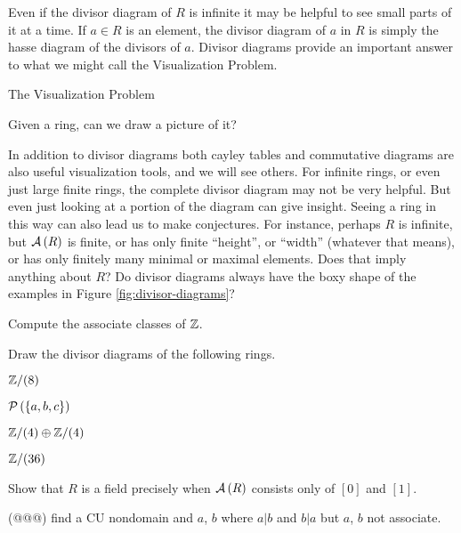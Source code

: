 Even if the divisor diagram of \(R\) is infinite it may be helpful to see small parts of it at a time.
If \(a \in R\) is an element, the divisor diagram of \(a\) in \(R\) is simply the hasse diagram of the divisors of \(a\).
Divisor diagrams provide an important answer to what we might call the Visualization Problem.
\begin{titlebox}{The Visualization Problem}
\begin{center}
Given a ring, can we draw a picture of it?
\end{center}
\end{titlebox}
In addition to divisor diagrams both cayley tables and commutative diagrams are also useful visualization tools, and we will see others.
For infinite rings, or even just large finite rings, the complete divisor diagram may not be very helpful.
But even just looking at a portion of the diagram can give insight.
Seeing a ring in this way can also lead us to make conjectures.
For instance, perhaps \(R\) is infinite, but \( \mathcal{A}\left(R\right) \) is finite, or has only finite ``height'', or ``width'' (whatever that means), or has only finitely many minimal or maximal elements. Does that imply anything about \(R\)?
Do divisor diagrams always have the boxy shape of the examples in Figure \ref{fig:divisor-diagrams}?



\Exercises%

\begin{exercise}
Compute the associate classes of \(\mathbb{Z}\).
\end{exercise}


\begin{exercise}
Draw the divisor diagrams of the following rings.
\begin{proplist*}
\item \(\mathbb{Z}/(8)\)
\item \(\mathcal{P}\left(\{a,b,c\}\right)\)
\item \(\mathbb{Z}/(4) \oplus \mathbb{Z}/(4)\)
\item \(\mathbb{Z}/(36)\)
\end{proplist*}
\end{exercise}


\begin{exercise}
Show that \(R\) is a field precisely when \( \mathcal{A}\left(R\right) \) consists only of \([0]\) and \([1]\).
\end{exercise}


\begin{exercise}
(@@@) find a CU nondomain and \(a\), \(b\) where \(a|b\) and \(b|a\) but \(a\), \(b\) not associate.
\end{exercise}


